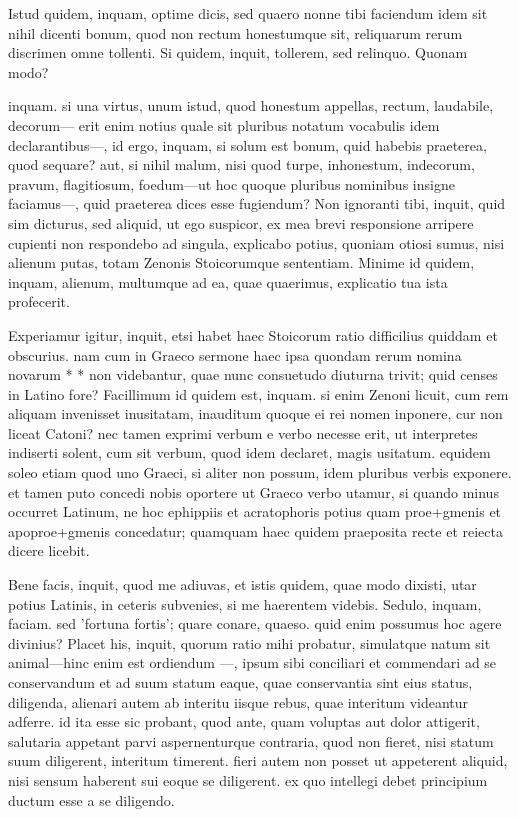  Istud quidem, inquam, optime dicis, sed quaero nonne tibi faciendum idem sit nihil dicenti bonum, quod non rectum honestumque sit, reliquarum rerum discrimen omne tollenti. Si quidem, inquit, tollerem, sed relinquo. Quonam modo?

 inquam. si una virtus, unum istud, quod honestum appellas, rectum, laudabile, decorum— erit enim notius quale sit pluribus notatum vocabulis idem declarantibus—, id ergo, inquam, si solum est bonum, quid habebis praeterea, quod sequare? aut, si nihil malum, nisi quod turpe, inhonestum, indecorum, pravum, flagitiosum, foedum—ut hoc quoque pluribus nominibus insigne faciamus—, quid praeterea dices esse fugiendum? Non ignoranti tibi, inquit, quid sim dicturus, sed aliquid, ut ego suspicor, ex mea brevi responsione arripere cupienti non respondebo ad singula, explicabo potius, quoniam otiosi sumus, nisi alienum putas, totam Zenonis Stoicorumque sententiam. Minime id quidem, inquam, alienum, multumque ad ea, quae quaerimus, explicatio tua ista profecerit.

 Experiamur igitur, inquit, etsi habet haec Stoicorum ratio difficilius quiddam et obscurius. nam cum in Graeco sermone haec ipsa quondam rerum nomina novarum * * non videbantur, quae nunc consuetudo diuturna trivit; quid censes in Latino fore? Facillimum id quidem est, inquam. si enim Zenoni licuit, cum rem aliquam invenisset inusitatam, inauditum quoque ei rei nomen inponere, cur non liceat Catoni? nec tamen exprimi verbum e verbo necesse erit, ut interpretes indiserti solent, cum sit verbum, quod idem declaret, magis usitatum. equidem soleo etiam quod uno Graeci, si aliter non possum, idem pluribus verbis exponere. et tamen puto concedi nobis oportere ut Graeco verbo utamur, si quando minus occurret Latinum, ne hoc ephippiis et acratophoris potius quam proe+gmenis et apoproe+gmenis concedatur; quamquam haec quidem praeposita recte et reiecta dicere licebit.

 Bene facis, inquit, quod me adiuvas, et istis quidem, quae modo dixisti, utar potius Latinis, in ceteris subvenies, si me haerentem videbis. Sedulo, inquam, faciam. sed 'fortuna fortis'; quare conare, quaeso. quid enim possumus hoc agere divinius? Placet his, inquit, quorum ratio mihi probatur, simulatque natum sit animal—hinc enim est ordiendum —, ipsum sibi conciliari et commendari ad se conservandum et ad suum statum eaque, quae conservantia sint eius status, diligenda, alienari autem ab interitu iisque rebus, quae interitum videantur adferre. id ita esse sic probant, quod ante, quam voluptas aut dolor attigerit, salutaria appetant parvi aspernenturque contraria, quod non fieret, nisi statum suum diligerent, interitum timerent. fieri autem non posset ut appeterent aliquid, nisi sensum haberent sui eoque se diligerent. ex quo intellegi debet principium ductum esse a se diligendo.

